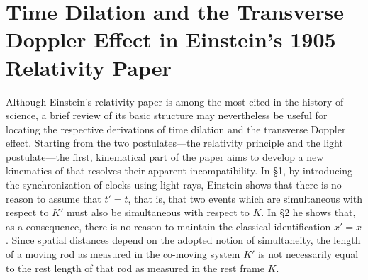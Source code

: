 \documentclass[pdflatex]{sn-jnl} %
\newcommand{\tDe}{transverse Doppler effect\xspace}
\begin{document}
\section{Time Dilation and the Transverse Doppler Effect in Einstein’s 1905 Relativity Paper}
%
Although Einstein’s \citeyear{Einstein1905} relativity paper is among the most cited in the history of science, a brief review of its basic structure may nevertheless be useful for locating the respective derivations of time dilation and the \tDe. Starting from the two postulates—the relativity principle and the light postulate—the first, kinematical part of the paper aims to develop a new kinematics of  \citep[892]{Einstein1905} that resolves their apparent incompatibility. In \S1, by introducing the synchronization of clocks using light rays, Einstein shows that there is no \apr reason to assume that $t'=t$, that is, that two events which are simultaneous with respect to $K'$ must also be simultaneous with respect to $K$. In \S2 he shows that, as a consequence, there is no \apr reason to maintain the classical identification $x'=x$. Since spatial distances depend on the adopted notion of simultaneity, the length of a moving rod as measured in the co-moving system $K'$ is not necessarily equal to the rest length of that rod as measured in the rest frame $K$. 
\end{document}
